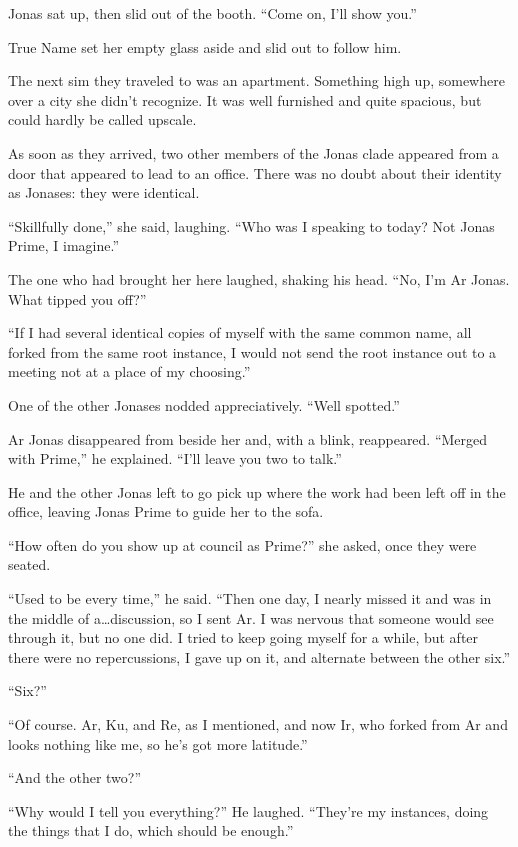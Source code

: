 Jonas sat up, then slid out of the booth. ``Come on, I'll show you.''

True Name set her empty glass aside and slid out to follow him.

The next sim they traveled to was an apartment. Something high up, somewhere over a city she didn't recognize. It was well furnished and quite spacious, but could hardly be called upscale.

As soon as they arrived, two other members of the Jonas clade appeared from a door that appeared to lead to an office. There was no doubt about their identity as Jonases: they were identical.

``Skillfully done,'' she said, laughing. ``Who was I speaking to today? Not Jonas Prime, I imagine.''

The one who had brought her here laughed, shaking his head. ``No, I'm Ar Jonas. What tipped you off?''

``If I had several identical copies of myself with the same common name, all forked from the same root instance, I would not send the root instance out to a meeting not at a place of my choosing.''

One of the other Jonases nodded appreciatively. ``Well spotted.''

Ar Jonas disappeared from beside her and, with a blink, reappeared. ``Merged with Prime,'' he explained. ``I'll leave you two to talk.''

He and the other Jonas left to go pick up where the work had been left off in the office, leaving Jonas Prime to guide her to the sofa.

``How often do you show up at council as Prime?'' she asked, once they were seated.

``Used to be every time,'' he said. ``Then one day, I nearly missed it and was in the middle of a\ldots discussion, so I sent Ar. I was nervous that someone would see through it, but no one did. I tried to keep going myself for a while, but after there were no repercussions, I gave up on it, and alternate between the other six.''

``Six?''

``Of course. Ar, Ku, and Re, as I mentioned, and now Ir, who forked from Ar and looks nothing like me, so he's got more latitude.''

``And the other two?''

``Why would I tell you everything?'' He laughed. ``They're my instances, doing the things that I do, which should be enough.''

